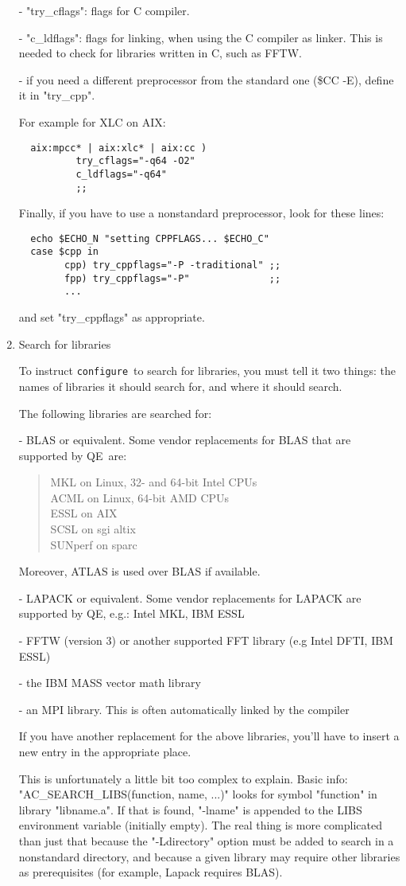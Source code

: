 \documentclass[12pt,a4paper]{article}
\def\qe{QE}
\def\configure{\texttt{configure}}
\begin{document}
\begin{enumerate}
- "try\_cflags": flags for C compiler.

- "c\_ldflags": flags for linking, when using the C compiler as linker.
This is needed to check for libraries written in C, such as FFTW.

- if you need a different preprocessor from the standard one (\$CC -E),
define it in "try\_cpp".

For example for XLC on AIX:
\begin{verbatim}
  aix:mpcc* | aix:xlc* | aix:cc )
          try_cflags="-q64 -O2"
          c_ldflags="-q64"
          ;;
\end{verbatim}
Finally, if you have to use a nonstandard preprocessor, look for these
lines:
\begin{verbatim}
  echo $ECHO_N "setting CPPFLAGS... $ECHO_C"
  case $cpp in
        cpp) try_cppflags="-P -traditional" ;;
        fpp) try_cppflags="-P"              ;;
        ...
\end{verbatim}
and set "try\_cppflags" as appropriate.

\item Search for libraries

To instruct \configure\ to search for libraries, you must tell it two
things: the names of libraries it should search for, and where it
should search.

The following libraries are searched for:

- BLAS or equivalent.
Some vendor replacements for BLAS that are supported by \qe\ are:
\begin{quote}
    MKL on Linux, 32- and 64-bit Intel CPUs\\
    ACML on Linux, 64-bit AMD CPUs\\
    ESSL on AIX\\
    SCSL on sgi altix\\
    SUNperf on sparc
\end{quote}
Moreover, ATLAS is used over BLAS if available.

- LAPACK or equivalent. Some vendor replacements for LAPACK are supported
  by \qe, e.g.: Intel MKL, IBM ESSL

- FFTW (version 3) or another supported FFT library (e.g Intel DFTI,
  IBM ESSL)

- the IBM MASS vector math library

- an MPI library. This is often automatically linked by the compiler

If you have another replacement for the above libraries, you'll have
to insert a new entry in the appropriate place.

This is unfortunately a little bit too complex to explain.
Basic info: \\
"AC\_SEARCH\_LIBS(function, name, ...)" looks for symbol
"function" in library "libname.a".  If that is found, "-lname" is
appended to the LIBS environment variable (initially empty).
The real thing is more complicated than just that because the
"-Ldirectory" option must be added to search in a nonstandard
directory, and because a given library may require other libraries as
prerequisites (for example, Lapack requires BLAS).
\end{enumerate}
\end{document}
